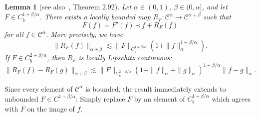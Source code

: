 \documentclass[a4paper,11pt]{article}
\newtheorem{lemma}{Lemma}
{\theorembodyfont{\rmfamily}\newtheorem{remark}{Remark}}
\newcommand{\CC}{\mathscr{C}}
\newcommand{\lpara}{\,\mathord{\prec}\,}
\begin{document}
\begin{lemma}[see also~{\cite{Bahouri2011}}, Theorem 2.92]
  \label{lemma:paralinearization}Let $\alpha \in (0, 1)$, $\beta \in (0,
  \alpha]$, and let $F \in C^{1 + \beta / \alpha}_b$. There exists a locally
  bounded map $R_F : \CC^{\alpha} \rightarrow \CC^{\alpha + \beta}$ such that
  \begin{equation}
    \label{eq:para-linearization} F (f) = F' (f) \lpara f + R_F (f)
  \end{equation}
  for all $f \in \CC^{\alpha}$. More precisely, we have
  \[ \|R_F (f)\|_{\alpha + \beta} \lesssim \|F\|_{C^{1 + \beta / \alpha}_b} 
     (1 +\|f\|_{\alpha}^{1 + \beta / \alpha}) . \]
  If $F \in C_b^{2 + \beta / \alpha}$, then $R_F$ is locally Lipschitz
  continuous:
  \[ \|R_F (f) - R_F (g)\|_{\alpha + \beta} \lesssim \|F\|_{C^{2 + \beta /
     \alpha}_b}  (1 +\|f\|_{\alpha} +\|g\|_{\alpha})^{1 + \beta / \alpha}  \|f
     - g\|_{\alpha} . \]
\end{lemma}

\begin{remark}
   Since every element of $\CC^\alpha$ is bounded, the result immediately extends to unbounded $F \in C^{1+\beta/\alpha}$: Simply replace $F$ by an element of $C^{1+\beta/\alpha}_b$ which agrees with $F$ on the image of $f$.
\end{remark}
\end{document}
